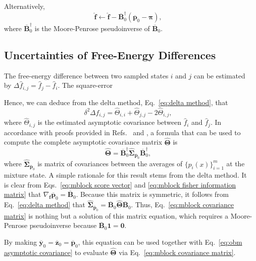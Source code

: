 \documentclass[journal=jctcce,manuscript=article,layout=twocolumn]{achemso}
\newcommand{\mt}[1]{\boldsymbol{\mathbf{#1}}}   %
\newcommand{\vt}[1]{\boldsymbol{\mathbf{#1}}}   %
\begin{document}
Alternatively,
\begin{equation*}
\label{eq:mics Newton-Raphson}
\hat{\vt f} \leftarrow \hat{\vt f} - \overline{\mt B}_0^\dag(\overline{\vt p}_0 - {\vt \pi}),
\end{equation*}
where $\overline{\mt B}_0^\dag$ is the Moore-Penrose pseudoinverse of $\overline{\mt B}_0$.

\subsection{Uncertainties of Free-Energy Differences}
\label{sec:uncertainties of free-energy differences}

The free-energy difference between two sampled states $i$ and $j$ can be estimated by $\Delta \hat f_{i,j} = \hat f_j - \hat f_i$. The square-error 

Hence, we can deduce from the delta method, Eq.~\eqref{eq:delta method}, that
\begin{equation}
\delta^2 \Delta f_{i,j} = \hat \Theta_{i,i} + \hat \Theta_{j,j} - 2\hat \Theta_{i,j},
\end{equation}
where $\hat \Theta_{i,j}$ is the estimated asymptotic covariance between $\hat f_i$ and $\hat f_j$. In accordance with proofs provided in Refs.~ and , a formula that can be used to compute the complete asymptotic covariance matrix $\hat{\mt \Theta}$ is
\begin{equation}
\label{eq:mblock covariance matrix}
\hat{\mt \Theta} = \overline{\mt B}_0^\dag \hat{\mt \Sigma}_{\overline{\vt p}_0} \overline{\mt B}_0^\dag,
\end{equation}
where $\hat{\mt \Sigma}_{\overline{\vt p}_0}$ is matrix of covariances between the averages of $\{p_i(x)\}_{i=1}^m$ at the mixture state. A simple rationale for this result stems from the delta method. It is clear from Eqs.~\eqref{eq:mblock score vector} and \eqref{eq:mblock fisher information matrix} that $\nabla_{\vt f}\overline{\vt p}_0 = \overline{\mt B}_0$. Because this matrix is symmetric, it follows from Eq.~\eqref{eq:delta method} that $\hat{\mt \Sigma}_{\overline{\vt p}_0} = \overline{\mt B}_0 \hat{\mt \Theta} \overline{\mt B}_0$. Thus, Eq.~\eqref{eq:mblock covariance matrix} is nothing but a solution of this matrix equation, which requires a Moore-Penrose pseudoinverse because $\overline{\mt B}_0 \vt 1 = \vt 0$.

By making $\overline{\vt y}_0 = \overline{\vt z}_0 = \overline{\vt p}_0$, this equation can be used together with Eq.~\eqref{eq:obm asymptotic covariance} to evaluate $\hat{\mt \Theta}$ via Eq.~\eqref{eq:mblock covariance matrix}.
\end{document}
